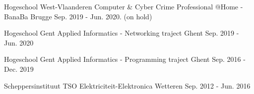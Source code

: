 

\begin{cventries}

\cventry
{Hogeschool West-Vlaanderen} %
{Computer \& Cyber Crime Professional @Home - BanaBa} %
{Brugge} %
{Sep. 2019 - Jun. 2020. (on hold)} %

\cventry
{Hogeschool Gent} %
{Applied Informatics - Networking traject} %
{Ghent} %
{Sep. 2019 - Jun. 2020} %

\cventry
{Hogeschool Gent} %
{Applied Informatics - Programming traject} %
{Ghent} %
{Sep. 2016 - Dec. 2019} %

\cventry
{Scheppersinstituut} %
{TSO Elektriciteit-Elektronica} %
{Wetteren} %
{Sep. 2012 - Jun. 2016} %

\end{cventries}
